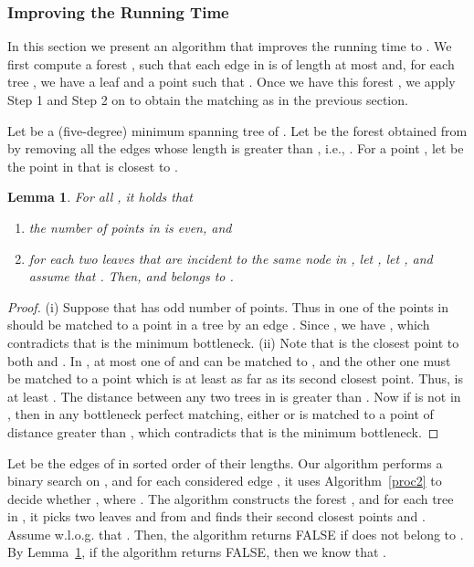 \documentclass[11pt,a4paper]{article}
\newtheorem{lemma}{Lemma}
\begin{document}
\subsubsection{Improving the Running Time}
In this section we present an algorithm that improves the running time to . We first compute a forest , such that each edge in  is of length at most  and, for each tree , we have a leaf  and a point  such that . Once we have this forest , we apply Step 1 and Step 2 on  to obtain the matching  as in the previous section. 

Let  be a (five-degree) minimum spanning tree of . 
Let  be the forest obtained from  by removing all the edges whose length is greater than , i.e., . For a point , let  be the point in  that is closest to .

\begin{lemma}
\label{opt-forest}
For all , it holds that
\begin{enumerate}
	\item[(i)]  the number of points in  is even, and
	\item[(ii)]  for each two leaves  that are incident to the same node  in , let , let , and assume that . Then,  and  belongs to .
\end{enumerate}
\end{lemma}
\begin{proof}
(i) Suppose that  has odd number of points. Thus in  one of the points in  should be matched to a point in a tree  by an edge . Since , we have , which contradicts that  is the minimum bottleneck. (ii) Note that  is the closest point to both  and . In , at most one of  and  can be matched to , and the other one must be matched to a point which is at least as far as its second closest point. Thus,  is at least . The distance between any two trees in  is greater than . Now if  is not in , then in any bottleneck perfect matching, either  or  is matched to a point of distance greater than , which contradicts that  is the minimum bottleneck.
\end{proof}


Let  be the edges of  in sorted order of their lengths. Our algorithm performs a binary search on , and for each considered edge , it uses Algorithm~\ref{proc2} to decide whether , where . 
The algorithm constructs the forest , and for each tree  in , it picks two leaves  and  from  and finds their second closest points  and . Assume w.l.o.g. that . Then, the algorithm returns FALSE if  does not belong to . By Lemma~\ref{opt-forest}, if the algorithm returns FALSE, then we know that . 
\end{document}

